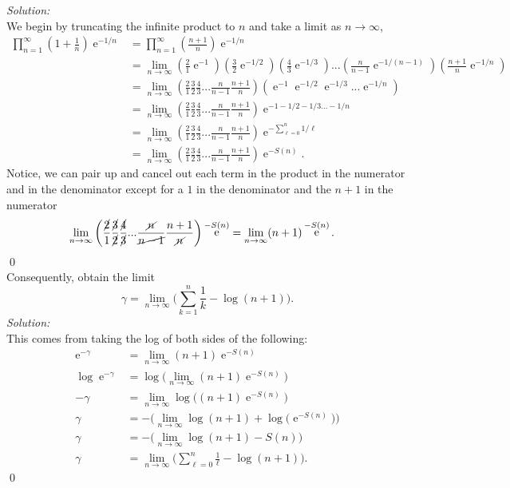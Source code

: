\documentclass[10pt]{amsart}
\DeclareMathOperator{\E}{e}
\theoremstyle{nonumberplain}
\begin{document}
\begin{enumerate}[label={\bf {\arabic*}:}]
\noindent
\textit{Solution:} \\
We begin by truncating the infinite product to $n$ and take a limit as $n \rightarrow \infty$, 
\begin{align*}
\prod_{n=1}^\infty \left(1 + \frac 1 n \right)\E^{-1/n} 
	&= \prod_{n=1}^\infty \left(\frac {n + 1} n \right)\E^{-1/n} \\
	&= \lim_{n\rightarrow\infty}
		\left(\frac {2} 1 \E^{-1} \right)
		\left(\frac {3} 2 \E^{-1/2} \right)
		\left(\frac {4} 3 \E^{-1/3} \right) ...
		\left(\frac {n} {n - 1} \E^{-1/(n - 1)} \right)
		\left(\frac {n + 1} n \E^{-1/n} \right) \\
	&= \lim_{n\rightarrow\infty}
		\left(\frac {2} 1 \frac {3} 2 \frac {4} 3 ... \frac {n} {n - 1}\frac {n + 1} n \right)
		\left( \E^{-1} \E^{-1/2}\E^{-1/3} ... \E^{-1/n} \right) \\
	&= \lim_{n\rightarrow\infty}
		\left(\frac {2} 1 \frac {3} 2 \frac {4} 3 ... \frac {n} {n - 1}\frac {n + 1} n \right)
		\E^{-1 -1/2 -1/3 ... -1/n} \\
	&= \lim_{n\rightarrow\infty}
		\left(\frac {2} 1 \frac {3} 2 \frac {4} 3 ... \frac {n} {n - 1}\frac {n + 1} n \right)
		\E^{-\sum_{\ell=0}^n 1/\ell} \\
	&= \lim_{n\rightarrow\infty}
		\left(\frac {2} 1 \frac {3} 2 \frac {4} 3 ... \frac {n} {n - 1}\frac {n + 1} n \right) \E^{-S(n)}.
\end{align*}
Notice, we can pair up and cancel out each term in the product in the numerator and in the denominator except for a $1$ in the denominator and the $n + 1$ in the numerator
\begin{align*}
\lim_{n\rightarrow\infty}
	\left(\frac {\cancel{2}} 1 \frac {\cancel{3}} {\cancel{2}} \frac {\cancel{4}} {\cancel{3}} ... \frac {\cancel n} {\cancel{n - 1}}
	\frac {n + 1} {\cancel n} \right) \E^{-S(n)}
&= \lim_{n\rightarrow\infty} (n + 1) \E^{-S(n)}.
\end{align*} \qed \\

\noindent
Consequently, obtain the limit
$$
\gamma = \lim_{n\rightarrow\infty} \Bigg(  \sum_{k=1}^n \frac 1 k - \log(n + 1)  \Bigg).
$$
\textit{Solution:} \\
This comes from taking the log of both sides of the following:
\begin{align*}
\E^{-\gamma} &= \lim_{n\rightarrow\infty} (n + 1) \E^{-S(n)} \\
\log \E^{-\gamma} &= \log\big( \lim_{n\rightarrow\infty} (n + 1) \E^{-S(n)} \big) \\
-\gamma &= \lim_{n\rightarrow\infty} \log\big( (n + 1) \E^{-S(n)} \big) \\
\gamma &= - \bigg(\lim_{n\rightarrow\infty} \log (n + 1) + \log \big(\E^{-S(n)}\big) \bigg) \\
\gamma &= - \bigg(\lim_{n\rightarrow\infty} \log (n + 1) - S(n) \bigg) \\
\gamma &= \lim_{n\rightarrow\infty} \Bigg (\sum_{\ell = 0}^n \frac 1 \ell - \log (n + 1) \Bigg ).
\end{align*} \qed \\


\end{enumerate}
\end{document}
